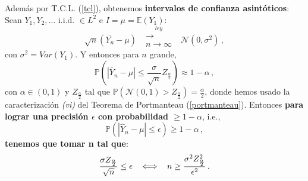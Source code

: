 \documentclass[letterpaper,11pt]{article} %
\def\espacio{\hspace{.25cm}\,}
\theoremstyle{defbreak}
\theoremstyle{propbreak}
\theoremstyle{remark}
\theoremstyle{break}
\def\ssi{\Longleftrightarrow}
\def\E{\mathbb{E}}
\def\P{\mathbb{P}}
\def\normal{\mathcal{N}}
\def\var{Var}
\def\convley{\mbox{ }\overset{ley}{\substack{\longrightarrow \\n \to \infty}}\mbox{ }}
\def\iid{\mbox{ i.i.d. }}
\begin{document}
Además por T.C.L. (\ref{tcl}), obtenemos \textbf{intervalos de confianza asintóticos}: Sean $Y_1,Y_2,\dots \iid\in L^2 $ e $I=\mu=\E(Y_1)$:
$$ \sqrt{n}(\bar{Y_n}-\mu)\convley\normal(0,\sigma^2) \, ,$$
con $\sigma^2=\var(Y_1)$. Y entonces para $n$ grande,
$$ \P(|\bar{Y}_n-\mu|\leq\displaystyle\frac{\sigma}{\sqrt{n}}Z_{\frac{\alpha}{2}})\approx 1-\alpha \, ,$$
con $\alpha\in(0,1)$ y $Z_{\frac{\alpha}{2}}$ tal que $\P(\normal(0,1)>Z_{\frac{\alpha}{2}})=\displaystyle\frac{\alpha}{2}$, donde hemos usado la caracterización \textit{(vi)} del Teorema de Portmanteau (\ref{portmanteau}).
\newp Entonces \textbf{para lograr una precisión $\epsilon$ con probabilidad $\geq1-\alpha$}, i.e., $$\P(|\hat{Y}_n-\mu|\leq \epsilon)\geq1-\alpha \, ,$$ \textbf{tenemos que tomar n tal que}:
$$ \displaystyle\frac{\sigma Z_{\frac{\alpha}{2}}}{\sqrt{n}}\leq\epsilon \espacio \ssi \espacio n \geq \frac{\sigma^2 Z^2_{\frac{\alpha}{2}}}{\epsilon^2} \, .$$
\vspace{1cm}
\end{document}
